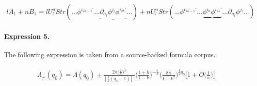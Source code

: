 \documentclass[11pt]{article}
\begin{document}
\begin{align*}lA_1+nB_1= l U^n_l Str\left(\ldots \phi^{i_{2k-1}'}\ldots \underbrace{\partial_{a_l}\phi^{j_l}\phi^{i_{2k}'}}\ldots \right)+n U^n_l Str\left(\ldots \phi^{i_{2k-1}'}\ldots \underbrace{\phi^{i_n}\phi^{i_{2k}'}}\ldots \partial_{a_l}\phi^{j_l}\ldots \right)\end{align*}

\paragraph{Expression 5.} The following expression is taken from a source-backed formula corpus.

\begin{align*}\Lambda_{\pm}(q_0)=\Lambda(q_0)\pm\frac{2\kappa\bigg(\frac{2}{\pi}\bigg)^{\frac{1}{2}}}{[\frac{1}{2}(q_0-1)]!}\bigg(\frac{1+k}{1-k}\bigg)^{-\frac{\kappa}{k}}\bigg(\frac{8\kappa}{1-k^2}\bigg)^{\frac{1}{2}q_0}\bigg[1+O\bigg(\frac{1}{\kappa}\bigg)\bigg]\end{align*}
\end{document}
